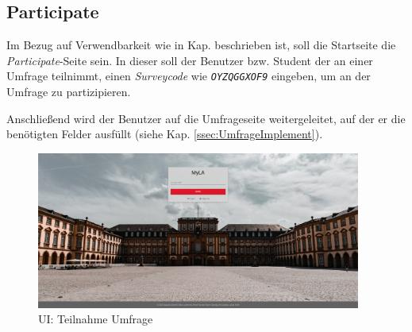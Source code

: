 
\subsection{Participate}
Im Bezug auf Verwendbarkeit wie in Kap.  beschrieben ist, soll die Startseite die \emph{Participate}-Seite sein. 
In dieser soll der Benutzer bzw. Student der an einer Umfrage teilnimmt, einen \emph{Surveycode} wie \zb \emph{\texttt{OYZQGGXOF9}} eingeben, um an der Umfrage zu partizipieren. 

Anschließend wird der Benutzer auf die Umfrageseite weitergeleitet, auf der er die benötigten Felder ausfüllt (siehe Kap. \vref{ssec:UmfrageImplement}).

\begin{figure}[hp]
	\centering
	\includegraphics[width=0.95\textwidth, keepaspectratio]{img/client/Participate.png}
	\captionsetup{justification=centering, format=plain}
	\caption[\acf{UI}: Teilnahme Umfrage]{\acf{UI}: Teilnahme Umfrage \\ \quelleScreenshot}
	\label{fig:ParticipateImplement}
\end{figure}